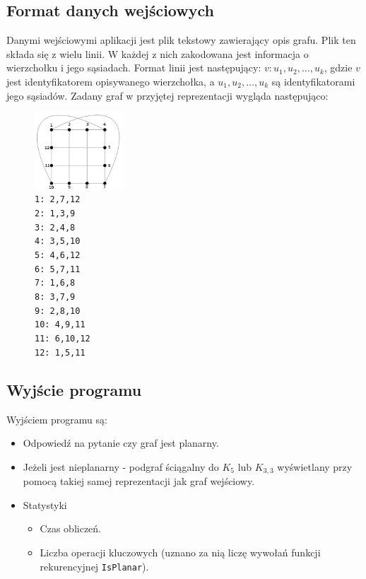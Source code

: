 \documentclass[a4 122pt]{article}
\begin{document}
	\subsection{Format danych wejściowych}
		Danymi wejściowymi aplikacji jest plik tekstowy zawierający opis grafu. Plik ten składa się z wielu linii. W każdej z nich zakodowana jest informacja o wierzchołku i jego sąsiadach. Format linii jest następujący:
		$v: u_1, u_2, \dots , u_k$, gdzie $v$ jest identyfikatorem opisywanego wierzchołka, a $u_1, u_2, \dots , u_k$ są identyfikatorami jego sąsiadów.
		Zadany graf w przyjętej reprezentacji wygląda następująco:
		\begin{figure}[h]
			\centering
			\includegraphics[width=0.3\textwidth]{include/graf.png}
			\caption*
{
\texttt{1: 2,7,12\\
2: 1,3,9\\
3: 2,4,8\\
4: 3,5,10\\
5: 4,6,12\\
6: 5,7,11\\
7: 1,6,8\\
8: 3,7,9\\
9: 2,8,10\\
10: 4,9,11\\
11: 6,10,12\\
12: 1,5,11}}
		\end{figure}
	\subsection{Wyjście programu}
	Wyjściem programu są:
	\begin{itemize}
	\item Odpowiedź na pytanie czy graf jest planarny.
	\item Jeżeli jest nieplanarny -  podgraf ściągalny do $K_5$ lub $K_{3,3}$ wyświetlany przy pomocą takiej samej reprezentacji jak graf wejściowy.
	\item Statystyki
		\begin{itemize}
		\item Czas obliczeń.
		\item Liczba operacji kluczowych (uznano za nią liczę wywołań funkcji rekurencyjnej \texttt{IsPlanar}).
		\end{itemize}
	\end{itemize}
	
\end{document}
